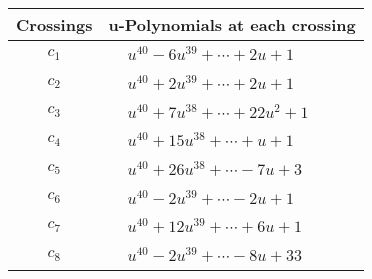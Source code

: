 \documentclass[1p]{elsarticle_modified}
\theoremstyle{definition}
\begin{document}
\begin{tabular}{m{50pt}|m{274pt}}
Crossings & \hspace{64pt}u-Polynomials at each crossing \\
\hline $$\begin{aligned}c_{1}\end{aligned}$$&$\begin{aligned}
&u^{40}-6 u^{39}+\cdots+2 u+1
\end{aligned}$\\
\hline $$\begin{aligned}c_{2}\end{aligned}$$&$\begin{aligned}
&u^{40}+2 u^{39}+\cdots+2 u+1
\end{aligned}$\\
\hline $$\begin{aligned}c_{3}\end{aligned}$$&$\begin{aligned}
&u^{40}+7 u^{38}+\cdots+22 u^2+1
\end{aligned}$\\
\hline $$\begin{aligned}c_{4}\end{aligned}$$&$\begin{aligned}
&u^{40}+15 u^{38}+\cdots+u+1
\end{aligned}$\\
\hline $$\begin{aligned}c_{5}\end{aligned}$$&$\begin{aligned}
&u^{40}+26 u^{38}+\cdots-7 u+3
\end{aligned}$\\
\hline $$\begin{aligned}c_{6}\end{aligned}$$&$\begin{aligned}
&u^{40}-2 u^{39}+\cdots-2 u+1
\end{aligned}$\\
\hline $$\begin{aligned}c_{7}\end{aligned}$$&$\begin{aligned}
&u^{40}+12 u^{39}+\cdots+6 u+1
\end{aligned}$\\
\hline $$\begin{aligned}c_{8}\end{aligned}$$&$\begin{aligned}
&u^{40}-2 u^{39}+\cdots-8 u+33
\end{aligned}$\\

\end{tabular}
\end{document}
